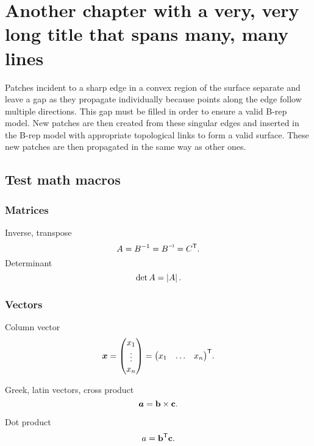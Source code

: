 \def\chapterabstract{This is the chapter abstract.}
\chapter{Another chapter with a very, very long title that spans many, many lines}%

\printskip 
Patches incident to a sharp edge in a convex region of the surface separate and leave a gap as they propagate individually because points along the edge follow multiple directions. 
This gap must be filled in order to ensure a valid B-rep model. New patches are then created from these singular edges and inserted in the B-rep model with appropriate topological links to form a valid surface. These new patches are then propagated in the same way as other ones.

\section{Test math macros}
\label{sec:testmathmacros}
\subsection{Matrices}
Inverse, transpose
\begin{equation}
	A = \inverse{B} = \inv{B} = \transpose{C}.
\end{equation}
Determinant
\begin{equation}
	\det A = \left\lvert {A} \right\rvert.
\end{equation}

\subsection{Vectors}

Column vector
\begin{equation}
	\boldsymbol{x} = \begin{pmatrix}  x_1 \\ \vdots \\ x_n  \end{pmatrix}
    = {\begin{pmatrix}  x_1 & \ldots & x_n  \end{pmatrix}} ^\mathsf{T}.
\end{equation}

Greek, latin vectors, cross product
\begin{equation}
	\boldsymbol{a} = {\mathbf{b}} \times {\mathbf{c}}.
\end{equation}

Dot product
\begin{equation}
	a = {\mathbf{b}} ^\mathsf{T} {\mathbf{c}}.
\end{equation}

